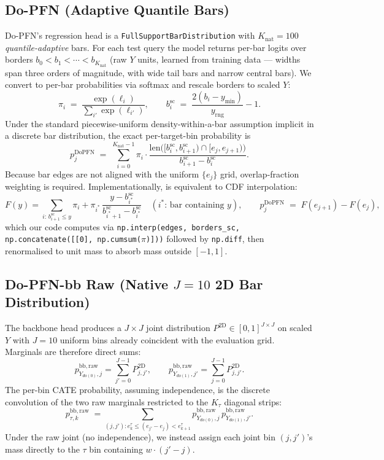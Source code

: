 \subsection{Do-PFN (Adaptive Quantile Bars)}
\label{app:dopfn}
Do-PFN's regression head is a \texttt{FullSupportBarDistribution} with
$K_{\text{nat}} = 100$ \emph{quantile-adaptive} bars.  For each test query the
model returns per-bar logits over borders
$b_0 < b_1 < \cdots < b_{K_{\text{nat}}}$ (raw $Y$ units, learned from
training data — widths span three orders of magnitude, with wide tail
bars and narrow central bars).  We convert to per-bar probabilities via
softmax and rescale borders to scaled $Y$:
\[
\pi_i \;=\; \frac{\exp(\ell_i)}{\sum_{i'} \exp(\ell_{i'})},
\qquad
b^{\text{sc}}_i \;=\; \frac{2(b_i - y_{\min})}{y_{\mathrm{rng}}} - 1.
\]
Under the standard piecewise-uniform density-within-a-bar assumption
implicit in a discrete bar distribution, the exact per-target-bin
probability is
\begin{equation}
\label{eq:dopfn-perbin}
p^{\mathrm{DoPFN}}_{j}
   \;=\;
   \sum_{i=0}^{K_{\text{nat}}-1}
   \pi_i \cdot
   \frac{\mathrm{len}\!\bigl([b^{\text{sc}}_i, b^{\text{sc}}_{i+1}) \cap [e_j, e_{j+1})\bigr)}
        {b^{\text{sc}}_{i+1} - b^{\text{sc}}_i}.
\end{equation}
Because bar edges are not aligned with the uniform $\{e_j\}$ grid,
overlap-fraction weighting is required.  Implementationally,
 is equivalent to CDF interpolation:
\[
F(y) = \sum_{i:\, b^{\text{sc}}_{i+1} \le y} \pi_i
       + \pi_{i^*}\, \frac{y - b^{\text{sc}}_{i^*}}{b^{\text{sc}}_{i^*+1} - b^{\text{sc}}_{i^*}}
       \quad (\text{$i^*$: bar containing $y$}),
\qquad
p^{\mathrm{DoPFN}}_{j} \;=\; F(e_{j+1}) - F(e_j),
\]
which our code computes via
\texttt{np.interp(edges, borders\_sc, np.concatenate([[0], np.cumsum($\pi$)]))}
followed by \texttt{np.diff}, then renormalised to unit mass to absorb
mass outside $[-1, 1]$.

\subsection{Do-PFN-bb Raw (Native $J{=}10$ 2D Bar Distribution)}
\label{app:bbraw}
The backbone head produces a $J \times J$ joint distribution
$P^{\mathrm{2D}} \in [0,1]^{J\times J}$ on scaled $Y$ with $J = 10$
uniform bins already coincident with the evaluation grid.  Marginals are
therefore direct sums:
\begin{equation}
p^{\mathrm{bb,raw}}_{Y_{do(0)}, j} = \sum_{j'=0}^{J-1} P^{\mathrm{2D}}_{j, j'},
\qquad
p^{\mathrm{bb,raw}}_{Y_{do(1)}, j'} = \sum_{j=0}^{J-1} P^{\mathrm{2D}}_{j, j'}.
\end{equation}
The per-bin CATE probability, assuming independence, is the discrete
convolution of the two raw marginals restricted to the $K_\tau$ diagonal
strips:
\[
p^{\mathrm{bb,raw}}_{\tau, k} \;=\!\!\!\!\!\sum_{(j, j') : e^\tau_k \le (e_{j'} - e_{j}) < e^\tau_{k+1}}\!\!\!\!\!
   p^{\mathrm{bb,raw}}_{Y_{do(0)}, j}\, p^{\mathrm{bb,raw}}_{Y_{do(1)}, j'}.
\]
Under the raw joint (no independence), we instead assign each joint bin
$(j, j')$'s mass directly to the $\tau$ bin containing
$w \cdot (j' - j)$.


